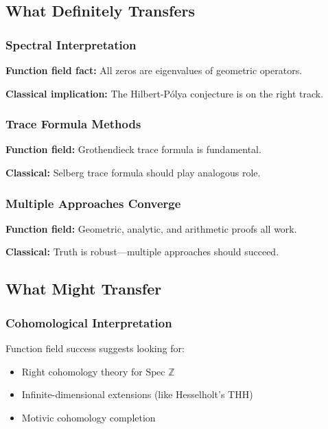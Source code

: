 \subsection{What Definitely Transfers}

\subsubsection{Spectral Interpretation}

\textbf{Function field fact:} All zeros are eigenvalues of geometric operators.

\textbf{Classical implication:} The Hilbert-Pólya conjecture is on the right track.

\subsubsection{Trace Formula Methods}

\textbf{Function field:} Grothendieck trace formula is fundamental.

\textbf{Classical:} Selberg trace formula should play analogous role.

\subsubsection{Multiple Approaches Converge}

\textbf{Function field:} Geometric, analytic, and arithmetic proofs all work.

\textbf{Classical:} Truth is robust—multiple approaches should succeed.

\subsection{What Might Transfer}

\subsubsection{Cohomological Interpretation}

Function field success suggests looking for:
\begin{itemize}
\item Right cohomology theory for $\text{Spec } \mathbb{Z}$
\item Infinite-dimensional extensions (like Hesselholt's THH)
\item Motivic cohomology completion
\end{itemize}

